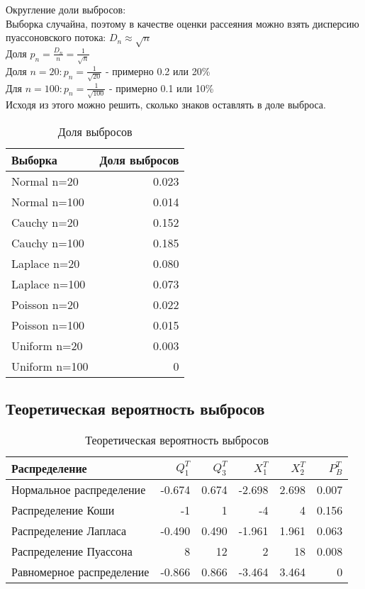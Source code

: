 \documentclass[a4paper]{article}
\begin{document}
\noindent Округление доли выбросов:\\
Выборка случайна, поэтому в качестве оценки рассеяния можно взять дисперсию пуассоновского потока:  $D_n \approx \sqrt{n}$\\
Доля $p_n = \frac{D_n}{n}=\frac{1}{\sqrt{n}}$\\
Доля $n=20: p_n=\frac{1}{\sqrt{20}}$ - примерно 0.2 или 20\% \\
Для $n=100: p_n=\frac{1}{\sqrt{100}}$ - примерно 0.1 или 10\% \\
Исходя из этого можно решить, сколько знаков оставлять в доле выброса.
\begin{table}[H]
		\centering
		\begin{tabular}[t]{lr}
			\hline
			Выборка   &      Доля выбросов		\\
			\hline
			Normal n=20   	&	0.023 				\\
			Normal n=100   	&  	0.014		\\
			Cauchy n=20 	& 	0.152  				\\
			Cauchy n=100	&  	0.185 		\\
			Laplace n=20	& 	0.080  			\\
			Laplace n=100	&       0.073 		\\
			Poisson n=20	&	0.022 				\\
			Poisson n=100	&	0.015				\\
			Uniform n=20	&	0.003 				\\
			Uniform n=100	&	0 				\\
			\hline
		\end{tabular}
		\caption{Доля выбросов}
		\label{tab:normal}
	\end{table}


\subsection{Теоретическая вероятность выбросов}
	\begin{table}[H]
		\centering
		\begin{tabular}[t]{lrrrrr}
			\hline
			Распределение   &      $Q_1^T$	& $Q_3^T$ & $X_1^T$ & $X_2^T$ & $P_B^T$	\\
			\hline
			Нормальное распределение 	& -0.674& 0.674 & -2.698 	&  2.698 	& 0.007 \\
			Распределение Коши 			& -1	& 1		&  -4		& 4			& 0.156 \\
			Распределение Лапласа 		&-0.490	& 0.490	& -1.961	& 1.961		& 0.063\\
			Распределение Пуассона 		& 8		& 12	& 2			& 18		& 0.008 \\
			Равномерное распределение 	&-0.866 & 0.866	& -3.464 	& 3.464 	& 0	\\
			
			\hline
		\end{tabular}
		\caption{Теоретическая вероятность выбросов}
		\label{tab:normal}
	\end{table}
	
\end{document}
